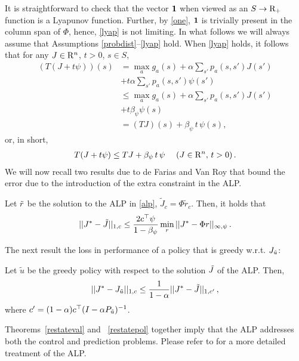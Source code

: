 It is straightforward to check that the vector $\mathbf{1}$ when viewed as an $S \to \mathrm{R}_+$ function 
is a Lyapunov function. 
Further, by \cref{one}, $\mathbf{1}$ is trivially present in the column span of $\Phi$, 
hence, \cref{lyap} is not limiting.
In what follows we will always assume that Assumptions \ref{probdist}--\ref{lyap} hold. 
When \cref{lyap} holds, it follows that for any $J\in \mathrm{R}^n$, $t>0$, $s\in S$,
\begin{align*}
(T(J+ t \psi))(s) &= 
\max_{a} g_a(s) + \alpha \sum_{s'} p_a(s,s') J(s') \\&+ t \alpha  \sum_{s'} p_a(s,s') \psi(s') \\
& \le 
\max_{a} g_a(s) + \alpha \sum_{s'} p_a(s,s') J(s') \\&+ t \beta_{\psi} \psi(s) \\
& = (T J)(s) + \beta_{\psi}\,t\,  \psi(s),
\end{align*}
or, in short,
\begin{align}
\label{eq:psilin}
T(J+ t \psi ) \le TJ + \beta_{\psi}\,t\,  \psi\,\, \quad (J\in \R^n,\, t>0)\,.
\end{align}
We will now recall two results due to de Farias and Van Roy that bound the error due to the introduction of the extra constraint in the ALP.
\begin{theorem}
\label{restateval}
Let $\tilde{r}$ be the solution to the ALP in \eqref{alp}, $\tilde{J}_c=\Phi \tilde{r}_c$.
Then, it holds that
\begin{align*}
||J^*-\tilde{J}||_{1,c}\leq \frac{2c^\top \psi}{1-\beta_{\psi}}\min_{r}||J^*-\Phi r||_{\infty,\psi}\,.
\end{align*}
\end{theorem}
The next result  the loss in performance of a policy that is greedy w.r.t. $J_{\tilde{u}}$:
\begin{theorem}
\label{restatepol}
Let $\tilde{u}$ be the greedy policy with respect to the solution $\tilde{J}$ of the ALP. Then,
\begin{align*}
||J^*-J_{\tilde{u}}||_{1,c}\leq \frac{1}{1-\alpha}||J^*-\tilde{J}||_{1,c'}\,,
\end{align*}
where $c'=(1-\alpha)c^\top(I-\alpha P_{\tilde{u}})^{-1}$.
\end{theorem}
Theorems~\ref{restateval} and ~\ref{restatepol} together imply that the ALP addresses both the control and prediction problems. Please refer to \cite{ALP} for a more detailed treatment of the ALP.\\
